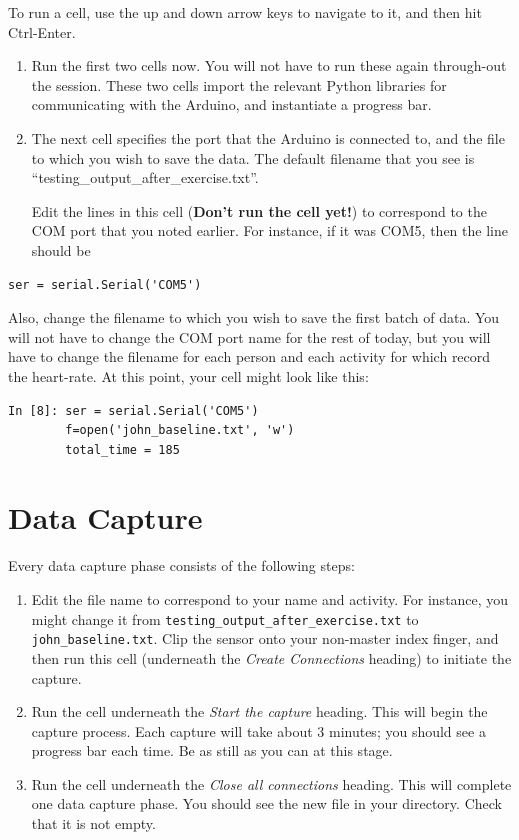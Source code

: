 \documentclass[11pt]{article}
\providecommand{\tightlist}{%
  \setlength{\itemsep}{0pt}\setlength{\parskip}{0pt}}
\begin{document}
To run a cell, use the up and down arrow keys to navigate
to it, and then hit Ctrl-Enter.

\begin{enumerate}
\def\labelenumi{\arabic{enumi}.}
\setcounter{enumi}{4}
\tightlist
\item
  Run the first two cells now. You will not have to run these again
  through-out the session. These two cells import the relevant Python libraries
  for communicating with the Arduino, and instantiate a progress bar.
\item
  The next cell specifies the port that the Arduino is connected to, and the
  file to which you wish to save the data. The default filename that you see is
  ``testing\_output\_after\_exercise.txt''.

  Edit the lines in this cell (\textbf{Don't run the cell yet!}) to
  correspond to the COM port that you noted earlier. For instance, if it
  was COM5, then the line should be
\end{enumerate}

\begin{verbatim}
ser = serial.Serial('COM5')
\end{verbatim}
  Also, change the filename to which you wish to save the first batch of data.
  You will not have to change the COM port name for the rest of today, but you
  will have to change the filename for each person and each activity for which
  record the heart-rate. At this point, your cell might look like this:
\begin{verbatim}
In [8]: ser = serial.Serial('COM5')
        f=open('john_baseline.txt', 'w')
        total_time = 185
\end{verbatim}

\hypertarget{data-capture}{%
\section{Data Capture}\label{data-capture}}

Every data capture phase consists of the following steps:

\begin{enumerate}
\def\labelenumi{\arabic{enumi}.}
\tightlist
\item
  Edit the file name to correspond to your name and activity. For
  instance, you might change it from
  \texttt{testing\_output\_after\_exercise.txt} to
  \texttt{john\_baseline.txt}. Clip the sensor onto your non-master
  index finger, and then run this cell (underneath the \emph{Create
  Connections} heading) to initiate the capture.
\item
  Run the cell underneath the \emph{Start the capture} heading. This
  will begin the capture process. Each capture will take about 3
  minutes; you should see a progress bar each time. Be as still as 
  you can at this stage.
\item
  Run the cell underneath the \emph{Close all connections} heading. This
  will complete one data capture phase. You should see the new file in
  your directory. Check that it is not empty.
\end{enumerate}
\end{document}

